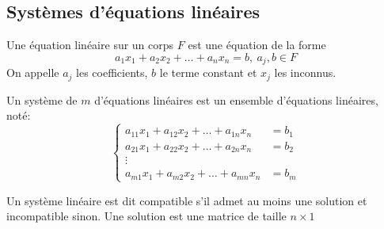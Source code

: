 \subsection{Systèmes d'équations linéaires}
\begin{definition}
    Une équation linéaire sur un corps $F$ est une équation de la forme
    \[ a_1x_1 + a_2x_2 + \ldots + a_nx_n = b, \ a_j, b \in F \]
    On appelle $a_j$ les coefficients, $b$ le terme constant et $x_j$ les inconnus.
\end{definition}
\begin{definition}
    Un système de $m$ d'équations linéaires est un ensemble d'équations linéaires, noté:
    \[ \begin{cases}
            a_{11}x_1 + a_{12}x_2 + \ldots + a_{1n}x_n & = b_1 \\
            a_{21}x_1 + a_{22}x_2 + \ldots + a_{2n}x_n & = b_2 \\
            \vdots                                             \\
            a_{m1}x_1 + a_{m2}x_2 + \ldots + a_{mn}x_n & = b_m
        \end{cases} \]
\end{definition}
\begin{definition}
    Un système linéaire est dit compatible s'il admet au moins une solution et incompatible sinon. Une solution est une matrice de taille $n \times 1$
\end{definition}
